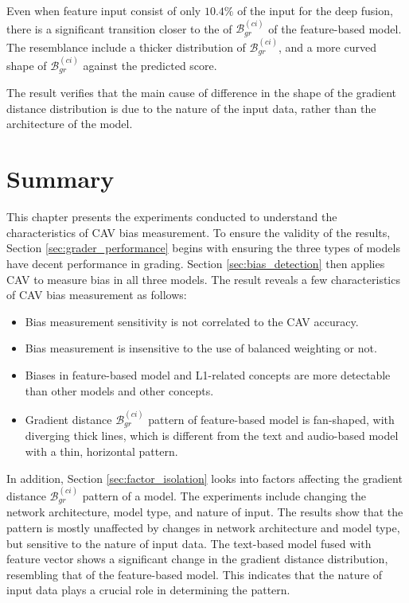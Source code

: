 Even when feature input consist of only $10.4\%$ of the input for the deep fusion, there is a significant transition closer to the of $\mathcal{B}_{gr}^{(ci)}$ of the feature-based model. The resemblance include a thicker distribution of $\mathcal{B}_{gr}^{(ci)}$, and a more curved shape of $\mathcal{B}_{gr}^{(ci)}$ against the predicted score.

The result verifies that the main cause of difference in the shape of the gradient distance distribution is due to the nature of the input data, rather than the architecture of the model.

\section{Summary}
This chapter presents the experiments conducted to understand the characteristics of CAV bias measurement. To ensure the validity of the results, Section \ref{sec:grader_performance} begins with ensuring the three types of models have decent performance in grading. Section \ref{sec:bias_detection} then applies CAV to measure bias in all three models. The result reveals a few characteristics of CAV bias measurement as follows:

\begin{itemize}
    \item Bias measurement sensitivity is not correlated to the CAV accuracy.
    \item Bias measurement is insensitive to the use of balanced weighting or not.
    \item Biases in feature-based model and L1-related concepts are more detectable than other models and other concepts.
    \item Gradient distance  $\mathcal{B}_{gr}^{(ci)}$ pattern of feature-based model is fan-shaped, with diverging thick lines, which is different from the text and audio-based model with a thin, horizontal pattern.
\end{itemize}

In addition, Section \ref{sec:factor_isolation} looks into factors affecting the gradient distance $\mathcal{B}_{gr}^{(ci)}$ pattern of a model. The experiments include changing the network architecture, model type, and nature of input. The results show that the pattern is mostly unaffected by changes in network architecture and model type, but sensitive to the nature of input data. The text-based model fused with feature vector shows a significant change in the gradient distance distribution, resembling that of the feature-based model. This indicates that the nature of input data plays a crucial role in determining the pattern.